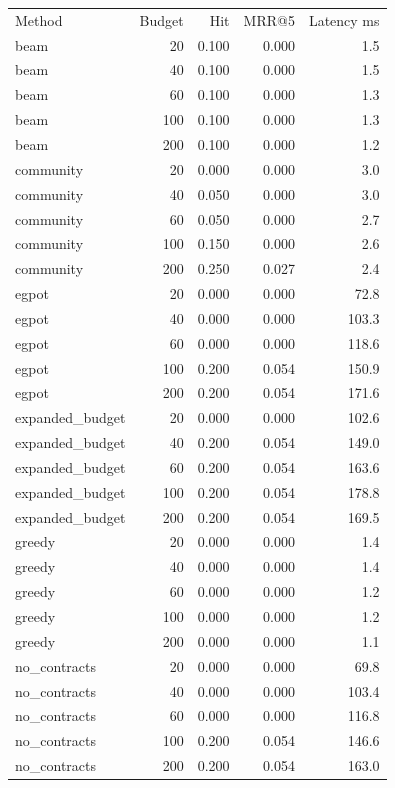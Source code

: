 \begin{tabular}{lrrrr}
Method & Budget & Hit & MRR@5 & Latency ms \\
beam & 20 & 0.100 & 0.000 & 1.5 \\
beam & 40 & 0.100 & 0.000 & 1.5 \\
beam & 60 & 0.100 & 0.000 & 1.3 \\
beam & 100 & 0.100 & 0.000 & 1.3 \\
beam & 200 & 0.100 & 0.000 & 1.2 \\
community & 20 & 0.000 & 0.000 & 3.0 \\
community & 40 & 0.050 & 0.000 & 3.0 \\
community & 60 & 0.050 & 0.000 & 2.7 \\
community & 100 & 0.150 & 0.000 & 2.6 \\
community & 200 & 0.250 & 0.027 & 2.4 \\
egpot & 20 & 0.000 & 0.000 & 72.8 \\
egpot & 40 & 0.000 & 0.000 & 103.3 \\
egpot & 60 & 0.000 & 0.000 & 118.6 \\
egpot & 100 & 0.200 & 0.054 & 150.9 \\
egpot & 200 & 0.200 & 0.054 & 171.6 \\
expanded\_budget & 20 & 0.000 & 0.000 & 102.6 \\
expanded\_budget & 40 & 0.200 & 0.054 & 149.0 \\
expanded\_budget & 60 & 0.200 & 0.054 & 163.6 \\
expanded\_budget & 100 & 0.200 & 0.054 & 178.8 \\
expanded\_budget & 200 & 0.200 & 0.054 & 169.5 \\
greedy & 20 & 0.000 & 0.000 & 1.4 \\
greedy & 40 & 0.000 & 0.000 & 1.4 \\
greedy & 60 & 0.000 & 0.000 & 1.2 \\
greedy & 100 & 0.000 & 0.000 & 1.2 \\
greedy & 200 & 0.000 & 0.000 & 1.1 \\
no\_contracts & 20 & 0.000 & 0.000 & 69.8 \\
no\_contracts & 40 & 0.000 & 0.000 & 103.4 \\
no\_contracts & 60 & 0.000 & 0.000 & 116.8 \\
no\_contracts & 100 & 0.200 & 0.054 & 146.6 \\
no\_contracts & 200 & 0.200 & 0.054 & 163.0 \\

\end{tabular}
